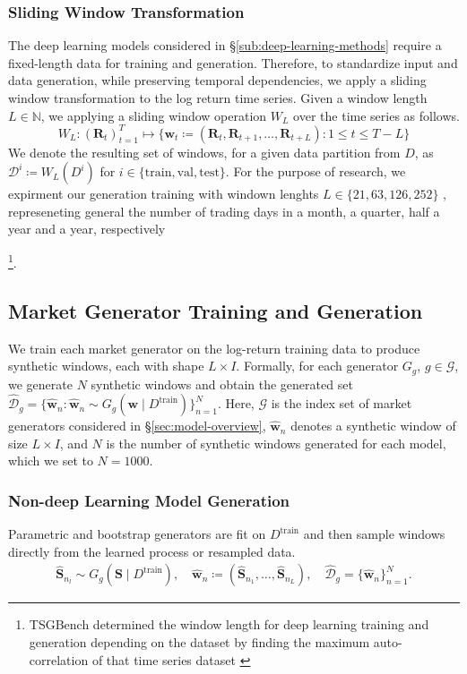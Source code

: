     \subsubsection{Sliding Window Transformation}
    The deep learning models considered in §\ref{sub:deep-learning-methods} require a fixed-length data
    for training and generation. Therefore, to standardize input and data generation, while preserving temporal dependencies,
    we apply a sliding window transformation to the log return time series. Given a
    window length $L\in\mathbb{N}$, we applying a sliding window operation $W_L$ over the time
    series as follows.
    \begin{equation}
        W_L: (\mathbf{R}_t)_{t=1}^T \mapsto \{ \mathbf{w}_t \coloneq(\mathbf{R}_t,\mathbf{R}_{t+1},\dots, \mathbf{R}_{t+L}): 1\leq t \leq T-L\}
    \end{equation}
    We denote the resulting set of windows, for a given data partition from $D$, as $\mathcal{D}^i\coloneq W_L(D^i)$ for $i\in\{\mathrm{train}, \mathrm{val}, \mathrm{test}\}$.
    For the purpose of research, we expirment our generation training with windown lenghts $L\in\{ 21, 63, 126 ,252\}$ , represeneting
    general the number of trading days in a month, a quarter, half a year and a year, respectively
    
    \footnote{TSGBench determined the window length for deep learning training 
    and generation depending on the dataset by finding the maximum auto-correlation of that time
    series dataset \cite{Ang23}}.


\subsection{Market Generator Training and Generation}\label{subsec:generator-training}
    We train each market generator on the log-return training data to
    produce synthetic windows, each with shape $L\times I$. Formally,
    for each generator $G_g$, $g\in\mathcal{G}$, we generate $N$ synthetic
    windows and obtain the generated set
    $\hat{\mathcal{D}}_g = \{\hat{\mathbf{w}}_n: \hat{\mathbf{w}}_n \sim G_g(\mathbf{w} \mid D^{\mathrm{train}})\}_{n=1}^N$.
    Here, $\mathcal{G}$ is the index set of market generators considered in
    §\ref{sec:model-overview}, $\hat{\mathbf{w}}_n$ denotes a synthetic
    window of size $L\times I$, and $N$ is the number of synthetic windows
    generated for each model, which we set to $N=1000$.

    \subsubsection{Non-deep Learning Model Generation}
    Parametric and bootstrap generators are fit on $D^{\mathrm{train}}$ and then
    sample windows directly from the learned process or resampled data.
    \begin{align}
        \hat{\mathbf{S}}_{n_l} \sim G_g(\mathbf{S} \mid D^{\mathrm{train}}), \quad
        \hat{\mathbf{w}}_n \coloneq (\hat{\mathbf{S}}_{n_1},\dots, \hat{\mathbf{S}}_{n_L}), \quad
        \hat{\mathcal{D}}_g = \{\hat{\mathbf{w}}_n\}_{n=1}^N.
    \end{align}

